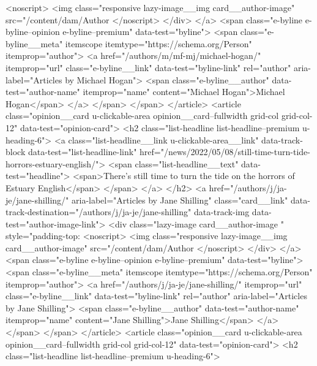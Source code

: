{{{<noscript>
<img class="responsive lazy-image__img card__author-image" src="/content/dam/Author%
</noscript>
</div>
</a>
<span class="e-byline e-byline--opinion e-byline--premium" data-test="byline">
<span class="e-byline__meta" itemscope itemtype="https://schema.org/Person" itemprop="author">
<a href="/authors/m/mf-mj/michael-hogan/" itemprop="url" class="e-byline__link" data-test="byline-link" rel="author" aria-label="Articles by Michael Hogan">
<span class="e-byline__author" data-test="author-name" itemprop="name" content="Michael Hogan">Michael Hogan</span>
</a>
</span>
</span>
</article>
<article class="opinion__card u-clickable-area opinion__card--fullwidth grid-col grid-col-12" data-test="opinion-card">
<h2 class="list-headline list-headline--premium u-heading-6">
<a class="list-headline__link u-clickable-area__link" data-track-block data-test="list-headline-link" href="/news/2022/05/08/still-time-turn-tide-horrors-estuary-english/">
<span class="list-headline__text" data-test="headline">
<span>There’s still time to turn the tide on the horrors of Estuary English</span>
</span>
</a>
</h2>
<a href="/authors/j/ja-je/jane-shilling/" aria-label="Articles by Jane Shilling" class="card__link" data-track-destination="/authors/j/ja-je/jane-shilling" data-track-img data-test="author-image-link">
<div class="lazy-image card__author-image  " style="padding-top:%
<noscript>
<img class="responsive lazy-image__img card__author-image" src="/content/dam/Author%
</noscript>
</div>
</a>
<span class="e-byline e-byline--opinion e-byline--premium" data-test="byline">
<span class="e-byline__meta" itemscope itemtype="https://schema.org/Person" itemprop="author">
<a href="/authors/j/ja-je/jane-shilling/" itemprop="url" class="e-byline__link" data-test="byline-link" rel="author" aria-label="Articles by Jane Shilling">
<span class="e-byline__author" data-test="author-name" itemprop="name" content="Jane Shilling">Jane Shilling</span>
</a>
</span>
</span>
</article>
<article class="opinion__card u-clickable-area opinion__card--fullwidth grid-col grid-col-12" data-test="opinion-card">
<h2 class="list-headline list-headline--premium u-heading-6">
}}}
